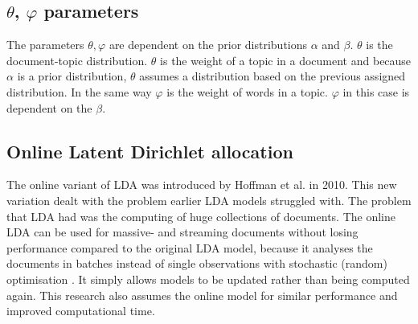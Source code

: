 \subsection{$\theta$, $\varphi$ parameters}\label{theory:thetavarphi}
The parameters $\theta, \varphi$ are dependent on the prior distributions $\alpha$ and $\beta$. $\theta$ is the document-topic distribution. $\theta$ is the weight of a topic in a document and because $\alpha$ is a prior distribution, $\theta$ assumes a distribution based on the previous assigned distribution. 
In the same way $\varphi$ is the weight of words in a topic. $\varphi$ in this case is dependent on the $\beta$.

\subsection{Online Latent Dirichlet allocation} \label{theory:onlinelda}
The online variant of LDA was introduced  by Hoffman et al. in 2010.\cite{Hoffman2010OnlineAllocation} This new variation dealt with the problem earlier LDA models struggled with. The problem that LDA had was the computing of huge collections of documents. The online LDA can be used for massive- and streaming documents without losing performance compared to the original LDA model, because it analyses the documents in batches instead of single observations with stochastic (random) optimisation \cite{Beaver2012}. It simply allows models to be updated rather than being computed again. This research also assumes the online model for similar performance and improved computational time. 


